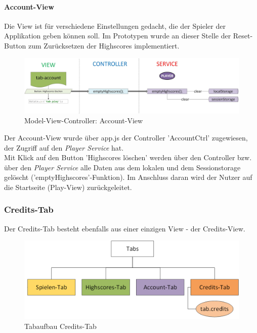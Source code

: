 \paragraph{Account-View}
%
%
Die View ist für verschiedene Einstellungen gedacht, die der Spieler der Applikation geben können soll. Im Prototypen wurde an dieser Stelle der Reset-Button zum Zurücksetzen der Highscores implementiert.
%
%
\begin{figure}[h]
\centering
\includegraphics[width=1\textwidth]{ref/images/07-account-tab.png}
\caption[Model-View-Controller: Account-View]{Model-View-Controller: Account-View}
\label{fig:MVC:Account-View}
\end{figure}
%
%


Der Account-View wurde über app.js der Controller 'AccountCtrl' zugewiesen, der Zugriff auf den \emph{Player Service} hat.
\\
Mit Klick auf den Button 'Highscores löschen' werden über den Controller bzw. über den \emph{Player Service} alle Daten aus dem lokalen und dem Sessionstorage gelöscht ('emptyHighscores'-Funktion). Im Anschluss daran wird der Nutzer auf die Startseite (Play-View) zurückgeleitet.
\subsubsection{Credits-Tab}
Der Credits-Tab besteht ebenfalls aus einer einzigen View - der Credits-View.
\begin{figure}[h]
\centering
\includegraphics[width=1\textwidth]{ref/images/tabs_credits.png}
\caption[Tabaufbau Credits-Tab]{Tabaufbau Credits-Tab}
\label{fig:Tabaufbau Credits-Tab}
\end{figure}

